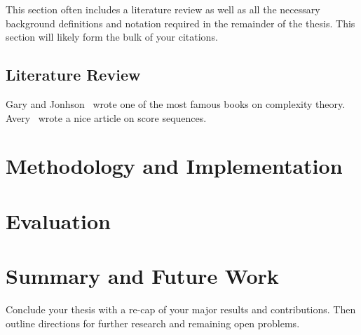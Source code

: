   This section often includes a literature review as well as all the necessary background definitions and notation required in the remainder of the thesis.  This section will likely form the bulk of your citations.  
  
\section{Literature Review}

Gary and Jonhson~\cite{Garey} wrote one of the most famous books on complexity theory.  Avery~\cite{Avery} wrote a nice article on score sequences.


\chapter{Methodology and Implementation}  
\label{chapter:methodology}


\chapter{Evaluation}  
\label{chapter:evaluation}



\chapter{Summary and Future Work}
\label{chapter:summary}

Conclude your thesis with a re-cap of your major results and contributions.  Then outline directions for further research and remaining open problems.